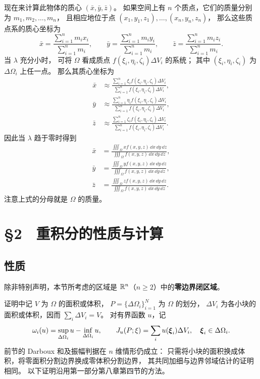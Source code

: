 现在来计算此物体的质心
$(\bar x,\bar y,\bar z)$。
如果空间上有 $n$ 个质点，它们的质量分别为
$m_1,m_2,\ldots,m_n$，
且相应地位于点
$(x_1,y_1,z_1),\ldots,(x_n,y_n,z_n)$，
那么这些质点系的质心坐标为
\[
\bar x=\frac{\sum_{i=1}^n m_i x_i}{\sum_{i=1}^n m_i},
\qquad
\bar y=\frac{\sum_{i=1}^n m_i y_i}{\sum_{i=1}^n m_i},
\qquad
\bar z=\frac{\sum_{i=1}^n m_i z_i}{\sum_{i=1}^n m_i}.
\]
当 $\lambda$ 充分小时，
可将 $\Omega$ 看成质点
$f(\xi_i,\eta_i,\zeta_i)\Delta V_i$ 的系统；
其中 $(\xi_i,\eta_i,\zeta_i)$ 为
$\Delta\Omega_i$ 上任一点。
那么其质心坐标为
\[
\begin{aligned}
\bar x&\approx
\frac{\sum_{i=1}^n
\xi_i f(\xi_i,\eta_i,\zeta_i)\Delta V_i}
{\sum_{i=1}^n f(\xi_i,\eta_i,\zeta_i)\Delta V_i},\\
\bar y&\approx
\frac{\sum_{i=1}^n
\eta_i f(\xi_i,\eta_i,\zeta_i)\Delta V_i}
{\sum_{i=1}^n f(\xi_i,\eta_i,\zeta_i)\Delta V_i},\\
\bar z&\approx
\frac{\sum_{i=1}^n
\zeta_i f(\xi_i,\eta_i,\zeta_i)\Delta V_i}
{\sum_{i=1}^n f(\xi_i,\eta_i,\zeta_i)\Delta V_i}.
\end{aligned}
\]
因此当 $\lambda$ 趋于零时得到
\[
\begin{aligned}
\bar x&=
\frac{\iiint_\Omega x f(x,y,z)\,\dd x\,\dd y\,\dd z}
{\iiint_\Omega f(x,y,z)\,\dd x\,\dd y\,\dd z},\\
\bar y&=
\frac{\iiint_\Omega y f(x,y,z)\,\dd x\,\dd y\,\dd z}
{\iiint_\Omega f(x,y,z)\,\dd x\,\dd y\,\dd z},\\
\bar z&=
\frac{\iiint_\Omega z f(x,y,z)\,\dd x\,\dd y\,\dd z}
{\iiint_\Omega f(x,y,z)\,\dd x\,\dd y\,\dd z}.
\end{aligned}
\]
注意上式的分母就是 $\Omega$ 的质量。











\section*{§2　重积分的性质与计算}

\subsection*{性质}

除非特别声明，本节所考虑的区域是 $\mathbb{R}^n$（$n\ge2$）中的\textbf{零边界闭区域}。

证明中记 $V$ 为 $\Omega$ 的面积或体积，
$P=\{\Delta\Omega_i\}_{i=1}^N$ 为 $\Omega$ 的划分，
$\Delta V_i$ 为各小块的面积或体积，因而 $\sum_i\Delta V_i=V$。
对有界函数 $u$，记
\[
\omega_i(u)=\sup_{\Delta\Omega_i}u-\inf_{\Delta\Omega_i}u,
\qquad
J_u(P;\xi)=\sum_i u(\boldsymbol{\xi}_i)\Delta V_i,
\quad \boldsymbol{\xi}_i\in\Delta\Omega_i.
\]
前节的 Darboux 和及振幅判据在 $n$ 维情形仍成立：
只需将小块的面积换成体积，将零面积分割边界换成零体积分割边界，
其共同加细与边界邻域估计的证明相同。
以下证明沿用第一部分第八章第四节的方法。



